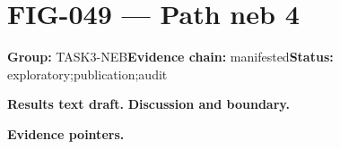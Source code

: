 \clearpage
\section{FIG-049 --- Path neb 4}
\label{figpage:fig-049}
\textbf{Group:} TASK3-NEB\quad \textbf{Evidence chain:} manifested\quad \textbf{Status:} exploratory;publication;audit

\textbf{Results text draft.} 
\textbf{Discussion and boundary.} 


\textbf{Evidence pointers.}



\vfill
